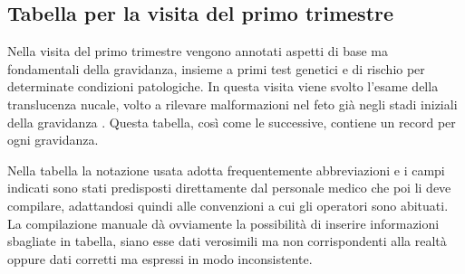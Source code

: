 \subsection{Tabella per la visita del primo trimestre}
\label{firsttrimester}

Nella visita del primo trimestre vengono annotati aspetti di base ma fondamentali della gravidanza, insieme a primi test genetici e di rischio per determinate condizioni patologiche.
In questa visita viene svolto l'esame della translucenza nucale, volto a rilevare malformazioni nel feto già negli stadi iniziali della gravidanza \cite{Sou05}.
Questa tabella, così come le successive, contiene un record per ogni gravidanza.

Nella tabella la notazione usata adotta frequentemente abbreviazioni e i campi indicati sono stati predisposti direttamente dal personale medico che poi li deve compilare, adattandosi quindi alle convenzioni a cui gli operatori sono abituati.
La compilazione manuale dà ovviamente la possibilità di inserire informazioni sbagliate in tabella, siano esse dati verosimili ma non corrispondenti alla realtà oppure dati corretti ma espressi in modo inconsistente.

